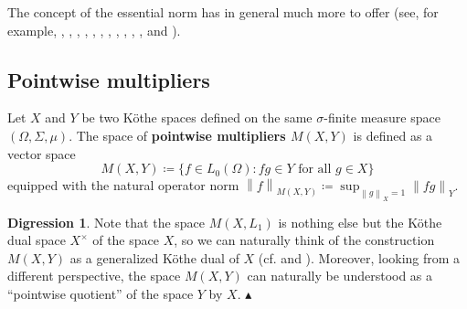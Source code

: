 \documentclass[11pt]{amsart}
\theoremstyle{definition}
\theoremstyle{definition}
\theoremstyle{definition}
\theoremstyle{definition}
\theoremstyle{definition}
\theoremstyle{definition}
\theoremstyle{definition}
\theoremstyle{definition}
\numberwithin{equation}{section}
\numberwithin{equation}{section}
\numberwithin{equation}{section}
\theoremstyle{definition}
\theoremstyle{definition}
\theoremstyle{definition}
\theoremstyle{definition}
\newtheorem{scholium}[theorem]{Digression}
\theoremstyle{definition}
\theoremstyle{definition}
\newcommand{\norm}[1]{\left\lVert#1\right\rVert}
\newcommand\xqed[1]{%
	\leavevmode\unskip\penalty9999 \hbox{}\nobreak\hfill
	\quad\hbox{#1}}
\newcommand\demo{\xqed{{\Large $\blacktriangle$}}}
\begin{document}
The concept of the essential norm has in general much more to offer
(see, for example, \cite{AT87}, \cite{AS83}, \cite{BV99}, \cite{AJS80}, \cite{Dil87}, \cite{ES05}, \cite{LM08}, \cite{LMN22},
\cite{LS71}, \cite{PS88}, \cite{ST94}, \cite{Sch89} and \cite{Tyl95}).

\subsection{Pointwise multipliers}

Let $X$ and $Y$ be two K{\" o}the spaces defined on the same $\sigma$-finite measure space $(\Omega,\Sigma,\mu)$.
The space of {\bf pointwise multipliers $M(X,Y)$} is defined as a vector space
\begin{equation*}
	M(X,Y) \coloneqq \{f \in L_0(\Omega) \colon fg \in Y \text{ for all } g \in X\}
\end{equation*}
equipped with the natural operator norm $\norm{f}_{M(X,Y)} \coloneqq \sup_{\norm{g}_X = 1} \norm{fg}_Y$.

\begin{scholium}
	Note that the space $M(X,L_1)$ is nothing else but the K{\" o}the dual space $X^{\times}$ of the space $X$, so we can naturally
	think of the construction $M(X,Y)$ as a generalized K{\" o}the dual of $X$ (cf. \cite{CDSP08} and \cite{MP89}). Moreover,
	looking from a different perspective, the space $M(X,Y)$ can naturally be understood as a \enquote{pointwise quotient} of the
	space $Y$ by $X$.
	\demo
\end{scholium}
\end{document}
